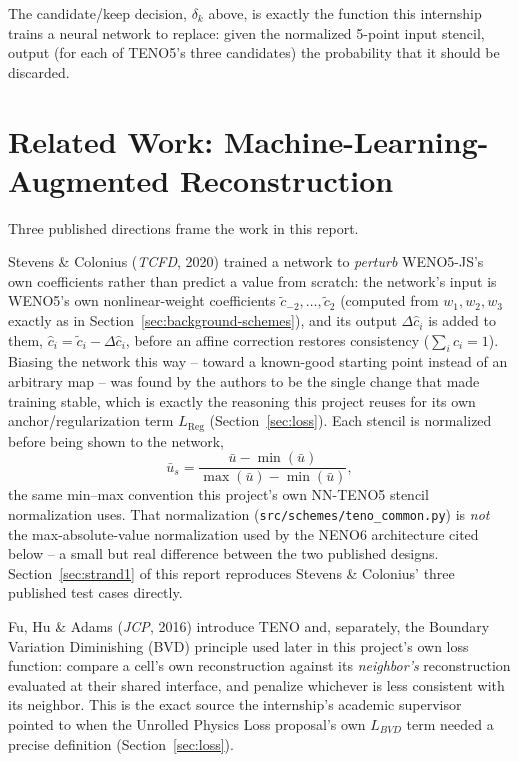 \documentclass[11pt]{article}
\begin{document}
The candidate/keep decision, $\delta_k$ above, is exactly the function
this internship trains a neural network to replace: given the normalized
5-point input stencil, output (for each of TENO5's three candidates) the
probability that it should be discarded.

\section{Related Work: Machine-Learning-Augmented Reconstruction}

Three published directions frame the work in this report.

Stevens \& Colonius (\emph{TCFD}, 2020) trained a network to \emph{perturb}
WENO5-JS's own coefficients rather than predict a value from scratch: the
network's input is WENO5's own nonlinear-weight coefficients $\tilde
c_{-2},\dots,\tilde c_2$ (computed from $w_1,w_2,w_3$ exactly as in
Section~\ref{sec:background-schemes}), and its output $\Delta\hat c_i$ is
added to them, $\hat c_i = \tilde c_i - \Delta\hat c_i$, before an affine
correction restores consistency ($\sum_i c_i = 1$). Biasing the network
this way -- toward a known-good starting point instead of an arbitrary
map -- was found by the authors to be the single change that made training
stable, which is exactly the reasoning this project reuses for its own
anchor/regularization term $L_{\text{Reg}}$ (Section~\ref{sec:loss}).
Each stencil is normalized before being shown to the network,
\[
\bar u_s = \frac{\bar u - \min(\bar u)}{\max(\bar u) - \min(\bar u)},
\]
the same min--max convention this project's own NN-TENO5 stencil
normalization uses. That normalization
(\texttt{src/schemes/teno\_common.py}) is \emph{not} the
max-absolute-value normalization used by the NENO6 architecture cited
below -- a small but real difference between the two published designs.
Section~\ref{sec:strand1} of this report reproduces Stevens \& Colonius'
three published test cases directly.

Fu, Hu \& Adams (\emph{JCP}, 2016) introduce TENO and, separately, the
Boundary Variation Diminishing (BVD) principle used later in this
project's own loss function: compare a cell's own reconstruction against
its \emph{neighbor's} reconstruction evaluated at their shared interface,
and penalize whichever is less consistent with its neighbor. This is the
exact source the internship's academic supervisor pointed to when the
Unrolled Physics Loss proposal's own $L_{BVD}$ term needed a precise
definition (Section~\ref{sec:loss}).
\end{document}
